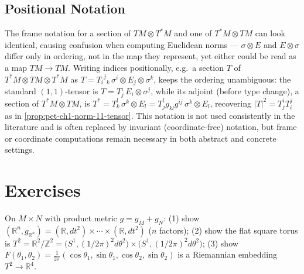 \subsection{Positional Notation}

\begin{remark}
  \label{rem:pet-ch1-positional-notation}
  \leanok
  The frame notation for a section of $TM\otimes T^*M$ and one of
  $T^*M\otimes TM$ can look identical, causing confusion when computing
  Euclidean norms — $\sigma\otimes E$ and $E\otimes\sigma$ differ only in
  ordering, not in the map they represent, yet either could be read as a map
  $TM\to TM$. Writing indices positionally, e.g.\ a section
  $T$ of $T^*M\otimes TM\otimes T^*M$ as $T={T_i}^j{}_k\,\sigma^i\otimes
  E_j\otimes\sigma^k$, keeps the ordering unambiguous: the standard
  $(1,1)$-tensor is $T=T^i_j\,E_i\otimes\sigma^j$, while its adjoint (before type
  change), a section of $T^*M\otimes TM$, is
  $T^*=T^l_k\,\sigma^k\otimes E_l=T^l_jg_{kl}g^{ij}\,\sigma^k\otimes E_l$,
  recovering $|T|^2=T^i_jT^j_i$ as in \cref{prop:pet-ch1-norm-11-tensor}. This
  notation is not used consistently in the literature and is often replaced by
  invariant (coordinate-free) notation, but frame or coordinate computations
  remain necessary in both abstract and concrete settings.
\end{remark}

\section{Exercises}

\begin{remark}
  \label{rem:pet-ch1-ex-1}
  \leanok
  On $M\times N$ with product metric $g=g_M+g_N$: (1) show
  $(\mathbb{R}^n,g_{\mathbb{R}^n})=(\mathbb{R},dt^2)\times\cdots\times(\mathbb{R},dt^2)$ ($n$ factors);
  (2) show the flat square torus is
  $T^2=\mathbb{R}^2/\mathbb{Z}^2=\big(S^1,(1/2\pi)^2d\theta^2\big)\times\big(S^1,(1/2\pi)^2d\theta^2\big)$;
  (3) show $F(\theta_1,\theta_2)=\tfrac1{2\pi}(\cos\theta_1,\sin\theta_1,\cos\theta_2,\sin\theta_2)$
  is a Riemannian embedding $T^2\to\mathbb{R}^4$.
\end{remark}

